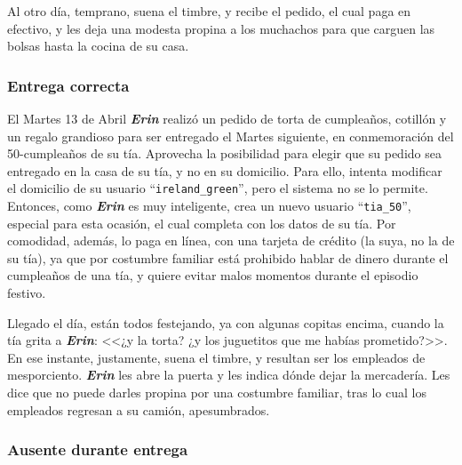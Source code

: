 Al otro día, temprano, suena el timbre, y recibe el pedido, el cual paga en
efectivo, y les deja una modesta propina a los muchachos para que carguen las
bolsas hasta la cocina de su casa.

\subsubsection{Entrega correcta}

El Martes 13 de Abril \textbf{\emph{Erin}} realizó un pedido de torta de
cumpleaños, cotillón y un regalo grandioso para ser entregado el Martes
siguiente, en conmemoración del 50-cumpleaños de su tía. Aprovecha la
posibilidad para elegir que su pedido sea entregado en la casa de su tía, y no
en su domicilio. Para ello, intenta modificar el domicilio de su usuario
``\texttt{ireland\_green}'', pero el sistema no se lo permite. Entonces, como
\textbf{\emph{Erin}} es muy inteligente, crea un nuevo usuario
``\texttt{tia\_50}'', especial para esta ocasión, el cual completa con los datos
de su tía. Por comodidad, además, lo paga en línea, con una tarjeta de crédito
(la suya, no la de su tía), ya que por costumbre familiar está prohibido hablar
de dinero durante el cumpleaños de una tía, y quiere evitar malos momentos
durante el episodio festivo.

Llegado el día, están todos festejando, ya con algunas copitas encima, cuando la
tía grita a \textbf{\emph{Erin}}: <<¿y la torta? ¿y los juguetitos que me habías
prometido?>>. En ese instante, justamente, suena el timbre, y resultan ser los
empleados de mesporciento. \textbf{\emph{Erin}} les abre la puerta y les indica
dónde dejar la mercadería. Les dice que no puede darles propina por una
costumbre familiar, tras lo cual los empleados regresan a su camión,
apesumbrados.

\subsubsection{Ausente durante entrega}

